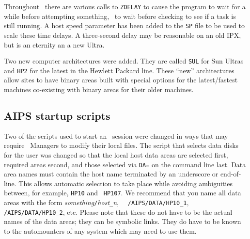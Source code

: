 Throughout \AIPS\ there are various calls to {\tt ZDELAY} to cause the
program to wait for a while before attempting something, \eg\ to wait
before checking to see if a task is still running.  A host speed
parameter has been added to the {\tt SP} file to be used to scale
these time delays.  A three-second delay may be reasonable on an old
IPX, but is an eternity an a new Ultra.

Two new computer architectures were added.  They are called {\tt SUL}
for Sun Ultras and {\tt HP2} for the latest in the Hewlett
Packard line.  These ``new'' architectures allow sites to have
binary areas built with special options for the latest/fastest
machines co-existing with binary areas for their older machines.

\subsection{AIPS startup scripts}

Two of the scripts used to start an \AIPS\ session were changed in
ways that may require \AIPS\ Managers to modify their local files.
The script that selects data disks for the user was changed so that
the local host data areas are selected first, required areas second,
and those selected via {\tt DA=} on the command line last.  Data area
names must contain the host name terminated by an underscore or
end-of-line.  This allows automatic selection to take place while
avoiding ambiguities between, for example, {\tt HP10} and {\tt
HP107}.  We recommend that you name all data areas with the form
{\it something\/}{\tt /}{\it host}{\tt \_}{\it n}, \eg\ {\tt
/AIPS/DATA/HP10\_1}, {\tt /AIPS/DATA/HP10\_2}, etc.  Please note that
these do not have to be the actual names of the data areas; they can
be symbolic links.  They do have to be known to the automounters of
any system which may need to use them.

